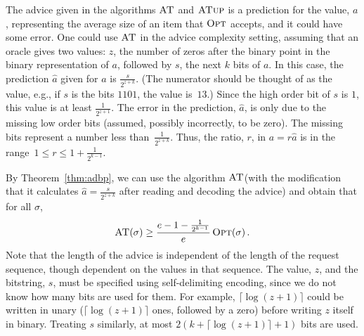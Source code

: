 \documentclass[a4paper,UKenglish,cleveref, autoref, thm-restate]{lipics-v2021}
\newcommand{\OPT}{\ensuremath{\operatorname{\textsc{Opt}}}\xspace}
\newcommand{\ADBML}{\ensuremath{\operatorname{\textsc{AT}}}\xspace}
\newcommand{\MLB}{\ensuremath{\operatorname{\textsc{ATup}}}\xspace}
\newcommand{\guess}{\ensuremath{\hat{a}}\xspace}
\begin{document}
The advice given in the algorithms \ADBML and \MLB is
a prediction for the value, $a$, representing the average size of an
item that \OPT accepts, and it could have some error. One could use
\ADBML in the advice complexity setting, assuming that an oracle gives
two values: $z$, the number of zeros after the binary point in the
binary representation of $a$, followed by $s$, the next $k$ bits of
$a$. In this case, the prediction $\guess$ given for $a$ is
$\frac{s}{2^{z+k}}$.  (The numerator should be thought of as the
value, e.g., if $s$ is the bits $1101$, the value is~$13$.)  Since the
high order bit of $s$ is $1$, this value is at least
$\frac{1}{2^{z+1}}$.  The error in the prediction, $\guess$, is only
due to the missing low order bits (assumed, possibly incorrectly, to
be zero).  The missing bits represent a number less
than~$\frac{1}{2^{z+k}}$.  Thus, the ratio, $r$, in $a=r\guess$ is in
the range~$1\leq r\leq 1+\frac{1}{2^{k-1}}$.

By Theorem~\ref{thm:adbp},
we can use the algorithm \ADBML (with the modification that it calculates
$\guess=\frac{s}{2^{z+k}}$ after reading and decoding the advice) and obtain
that for all $\sigma$,
$$\ADBML(\sigma) \geq \frac{e-1-\frac{1}{2^{k-1}}}{e}\OPT(\sigma)\,.$$
Note that the length of the advice is independent of the length of the
request sequence, though dependent on the values in that sequence.
The value, $z$, and the bitstring, $s$, must be specified using
self-delimiting encoding, since we do not know how many bits are used
for them. For example, $\lceil \log (z+1)\rceil$ could be written in
unary ($\lceil \log (z+1)\rceil$ ones, followed by a zero) before
writing $z$ itself in binary. Treating $s$ similarly, at most
$2(k+\lceil \log (z+1)\rceil +1)$ bits are used.
\end{document}
